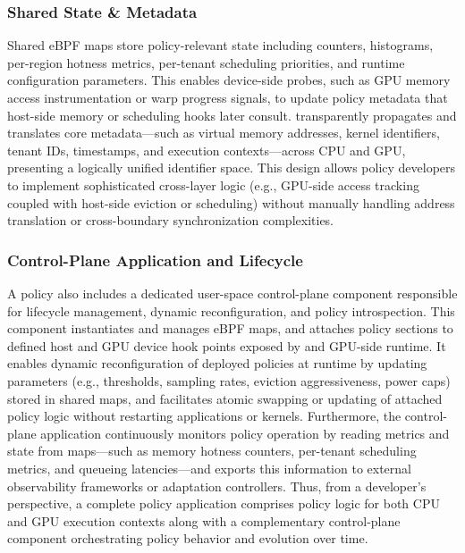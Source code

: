 \subsubsection{Shared State \& Metadata}

Shared eBPF maps store policy-relevant state including counters, histograms, per-region hotness metrics, per-tenant scheduling priorities, and runtime configuration parameters. This enables device-side probes, such as GPU memory access instrumentation or warp progress signals, to update policy metadata that host-side memory or scheduling hooks later consult. \sys transparently propagates and translates core metadata—such as virtual memory addresses, kernel identifiers, tenant IDs, timestamps, and execution contexts—across CPU and GPU, presenting a logically unified identifier space. This design allows policy developers to implement sophisticated cross-layer logic (e.g., GPU-side access tracking coupled with host-side eviction or scheduling) without manually handling address translation or cross-boundary synchronization complexities.

\subsubsection{Control-Plane Application and Lifecycle}

A \sys policy also includes a dedicated user-space control-plane component responsible for lifecycle management, dynamic reconfiguration, and policy introspection. This component instantiates and manages eBPF maps, and attaches policy sections to defined host and GPU device hook points exposed by \sysdriver and GPU-side runtime. It enables dynamic reconfiguration of deployed policies at runtime by updating parameters (e.g., thresholds, sampling rates, eviction aggressiveness, power caps) stored in shared maps, and facilitates atomic swapping or updating of attached policy logic without restarting applications or kernels. Furthermore, the control-plane application continuously monitors policy operation by reading metrics and state from maps—such as memory hotness counters, per-tenant scheduling metrics, and queueing latencies—and exports this information to external observability frameworks or adaptation controllers. Thus, from a developer's perspective, a complete \sys policy application comprises policy logic for both CPU and GPU execution contexts along with a complementary control-plane component orchestrating policy behavior and evolution over time.

